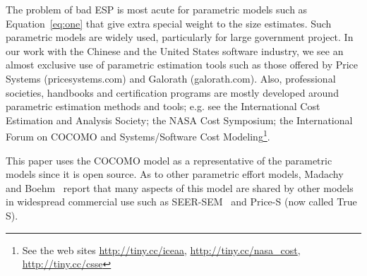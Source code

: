 \documentclass[final,twocolumn]{elsarticle}
\newcommand{\eq}[1]{Equation~\ref{eq:#1}}
\theoremstyle{break}
\begin{document}
The problem of bad ESP is most acute for parametric models such as \eq{one} that give
extra special weight to the size estimates.
Such parametric models are widely used, particularly for large government project.
In our work with the Chinese and the United States software industry,
we see an   almost exclusive
use  of parametric estimation tools such as those offered by 
Price Systems (pricesystems.com) and  Galorath (galorath.com).
Also,
professional societies, handbooks and
certification programs are mostly developed around 
parametric estimation methods and tools; e.g. see the 
International Cost Estimation and Analysis Society; the
NASA Cost Symposium;  the
International Forum on COCOMO and Systems/Software
Cost Modeling\footnote{See the web sites \url{http://tiny.cc/iceaa}, \url{http://tiny.cc/nasa_cost}, \url{http://tiny.cc/csse}}.

 This paper uses the COCOMO model as a representative of the parametric models since it is open source.
 As to other parametric effort models,
 Madachy and Boehm~\cite{madachy2008comparative} report that many aspects of this model
 are shared by other models in widespread commercial
 use such as  SEER-SEM~\cite{boehm00b} and Price-S (now called True S).
\end{document}
